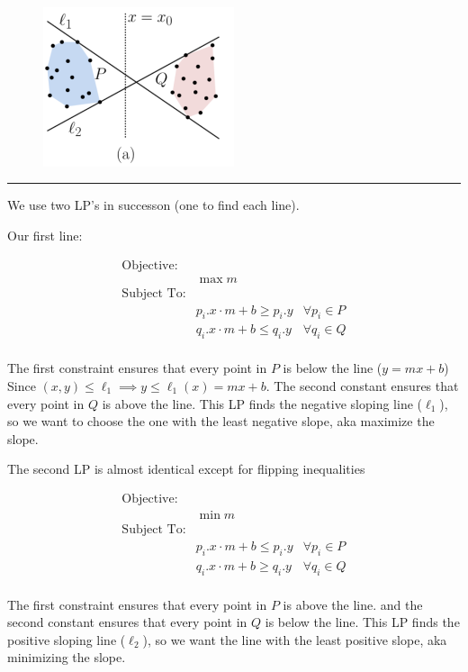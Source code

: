 \documentclass[11pt]{article}
\begin{document}
\begin{figure}[h]
  \centering
  \includegraphics[width = 0.5\textwidth]{lp_a.png}
\end{figure}

\hrule


We use two LP's in successon (one to find each line).

Our first line:



\begin{align*}
  \text{Objective: }\, & & \\
  & \max m & \\
  \text{Subject To:} & & \\
  & p_i.x \cdot m + b \geq p_i.y & \forall p_i \in P \\
  & q_i.x \cdot m + b \leq q_i.y & \forall q_i \in Q \\
\end{align*}

The first constraint ensures that every point in $P$ is below the line ($y = mx + b$)
Since $(x, y) \leq \ell_1 \implies y \leq \ell_1(x) = m x + b$.
The second constant ensures that every point in $Q$ is above the line.
This LP finds the negative sloping line ($\ell_1$), so we want to choose the one with the least negative slope,
aka maximize the slope.

The second LP is almost identical except for flipping inequalities

\begin{align*}
  \text{Objective: }\, & & \\
  & \min m & \\
  \text{Subject To:} & & \\
  & p_i.x \cdot m + b \leq p_i.y & \forall p_i \in P \\
  & q_i.x \cdot m + b \geq q_i.y & \forall q_i \in Q \\
\end{align*}

The first constraint ensures that every point in $P$ is above the line.
and the second constant ensures that every point in $Q$ is below the line.
This LP finds the positive sloping line ($\ell_2$), so we want the line with the least positive slope,
aka minimizing the slope.
\end{document}
